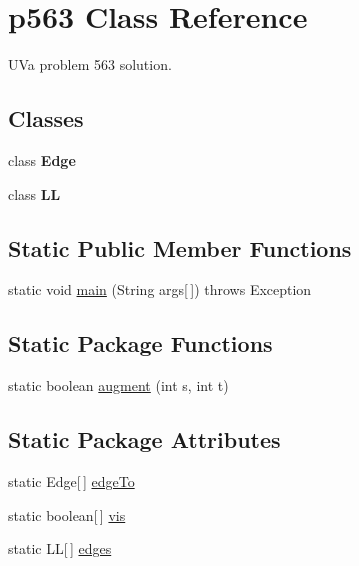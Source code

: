 \hypertarget{classp563}{
\section{p563 Class Reference}
\label{classp563}
}


UVa problem 563 solution.  


\subsection*{Classes}
\begin{DoxyCompactItemize}
\item 
class {\bfseries Edge}
\item 
class {\bfseries LL}
\end{DoxyCompactItemize}
\subsection*{Static Public Member Functions}
\begin{DoxyCompactItemize}
\item 
static void \hyperlink{classp563_a09315047433d5fc950616552b6270341}{main} (String args\mbox{[}$\,$\mbox{]})  throws Exception 
\end{DoxyCompactItemize}
\subsection*{Static Package Functions}
\begin{DoxyCompactItemize}
\item 
static boolean \hyperlink{classp563_abdfd906ff340324fe3ede3cbe7fa7120}{augment} (int s, int t)
\end{DoxyCompactItemize}
\subsection*{Static Package Attributes}
\begin{DoxyCompactItemize}
\item 
static Edge\mbox{[}$\,$\mbox{]} \hyperlink{classp563_a0cc692a892ddcf0725f3f08d27a773e7}{edgeTo}
\item 
static boolean\mbox{[}$\,$\mbox{]} \hyperlink{classp563_a0f8bbcf33059eee850855a9cf716813a}{vis}
\item 
static LL\mbox{[}$\,$\mbox{]} \hyperlink{classp563_a07f243c43eb4df6806247f1f4af97b5a}{edges}
\end{DoxyCompactItemize}


